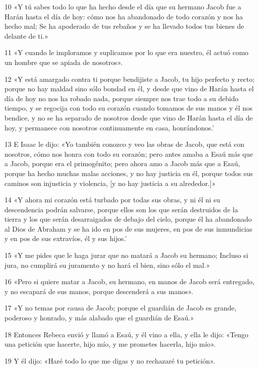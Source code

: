 \par 10 «Y tú sabes todo lo que ha hecho desde el día que su hermano Jacob fue a Harán hasta el día de hoy: cómo nos ha abandonado de todo corazón y nos ha hecho mal; Se ha apoderado de tus rebaños y se ha llevado todos tus bienes de delante de ti.»
\par 11 «Y cuando le imploramos y suplicamos por lo que era nuestro, él actuó como un hombre que se apiada de nosotros».
\par 12 «Y está amargado contra ti porque bendijiste a Jacob, tu hijo perfecto y recto; porque no hay maldad sino sólo bondad en él, y desde que vino de Harán hasta el día de hoy no nos ha robado nada, porque siempre nos trae todo a su debido tiempo, y se regocija con todo su corazón cuando tomamos de sus manos y él nos bendice, y no se ha separado de nosotros desde que vino de Harán hasta el día de hoy, y permanece con nosotros continuamente en casa, honrándonos.'
\par 13 E Isaac le dijo: «Yo también conozco y veo las obras de Jacob, que está con nosotros, cómo nos honra con todo su corazón; pero antes amaba a Esaú más que a Jacob, porque era el primogénito; pero ahora amo a Jacob más que a Esaú, porque ha hecho muchas malas acciones, y no hay justicia en él, porque todos sus caminos son injusticia y violencia, [y no hay justicia a su alrededor.]»
\par 14 «Y ahora mi corazón está turbado por todas sus obras, y ni él ni su descendencia podrán salvarse, porque ellos son los que serán destruidos de la tierra y los que serán desarraigados de debajo del cielo, porque él ha abandonado al Dios de Abraham y se ha ido en pos de sus mujeres, en pos de sus inmundicias y en pos de sus extravíos, él y sus hijos.'
\par 15 «Y me pides que le haga jurar que no matará a Jacob su hermano; Incluso si jura, no cumplirá su juramento y no hará el bien, sino sólo el mal.»
\par 16 «Pero si quiere matar a Jacob, su hermano, en manos de Jacob será entregado, y no escapará de sus manos, porque descenderá a sus manos».
\par 17 «Y no temas por causa de Jacob; porque el guardián de Jacob es grande, poderoso y honrado, y más alabado que el guardián de Esaú.»
\par 18 Entonces Rebeca envió y llamó a Esaú, y él vino a ella, y ella le dijo: «Tengo una petición que hacerte, hijo mío, y me prometes hacerla, hijo mío».
\par 19 Y él dijo: «Haré todo lo que me digas y no rechazaré tu petición».
